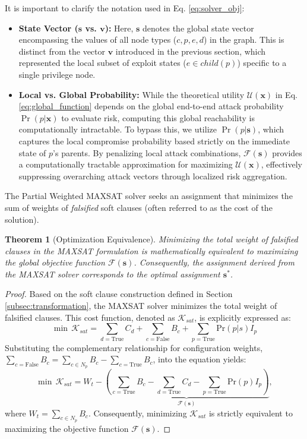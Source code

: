 \documentclass[conference]{IEEEtran}
\theoremstyle{definition} %
\theoremstyle{plain} %
\newtheorem{theorem}{Theorem}
\begin{document}
It is important to clarify the notation used in Eq. \eqref{eq:solver_obj}:
\begin{itemize}
    \item \textbf{State Vector ($\mathbf{s}$ vs. $\mathbf{v}$):} Here, $\mathbf{s}$ denotes the global state vector encompassing the values of all node types ($c, p, e, d$) in the graph. This is distinct from the vector $\mathbf{v}$ introduced in the previous section, which represented the local subset of exploit states ($e \in child(p)$) specific to a single privilege node.
    
    \item \textbf{Local vs. Global Probability:} While the theoretical utility $\mathcal{U}(\mathbf{x})$ in Eq. \eqref{eq:global_function} depends on the global end-to-end attack probability $\Pr(p|\mathbf{x})$ to evaluate risk, computing this global reachability is computationally intractable. To bypass this, we utilize $\Pr(p|\mathbf{s})$, which captures the local compromise probability based strictly on the immediate state of $p$'s parents. By penalizing local attack combinations, $\mathcal{F}(\mathbf{s})$ provides a computationally tractable approximation for maximizing $\mathcal{U}(\mathbf{x})$, effectively suppressing overarching attack vectors through localized risk aggregation.
\end{itemize}

The Partial Weighted MAXSAT solver seeks an assignment that minimizes the sum of weights of \textit{falsified} soft clauses (often referred to as the cost of the solution).

\begin{theorem}[Optimization Equivalence]
\label{thm:optim}
Minimizing the total weight of falsified clauses in the MAXSAT formulation is mathematically equivalent to maximizing the global objective function $\mathcal{F}(\mathbf{s})$. Consequently, the assignment derived from the MAXSAT solver corresponds to the optimal assignment $\mathbf{s}^*$.
\end{theorem}

\begin{proof}
Based on the soft clause construction defined in Section \ref{subsec:transformation}, the MAXSAT solver minimizes the total weight of falsified clauses. This cost function, denoted as $\mathcal{K}_{sat}$, is explicitly expressed as:
\begin{equation}
    \min\, \mathcal{K}_{sat} = \sum_{d=\text{True}} C_d + \sum_{c=\text{False}} B_c + \sum_{p=\text{True}} \text{Pr}(p|s)I_p
\end{equation}
Substituting the complementary relationship for configuration weights, $\sum_{c=\text{False}} B_c = \sum_{c \in N_p} B_c - \sum_{c=\text{True}} B_c$, into the equation yields:
\begin{equation}
    \min\, \mathcal{K}_{sat} = W_{t} - \underbrace{\left( \sum_{c=\text{True}} B_c - \sum_{d=\text{True}} C_d - \sum_{p=\text{True}} \text{Pr}(p)I_p \right)}_{\mathcal{F}(\mathbf{s})},
\end{equation}
where $W_{t} = \sum_{c \in N_p}B_c$. 
Consequently, minimizing $\mathcal{K}_{sat}$ is strictly equivalent to maximizing the objective function $\mathcal{F}(\mathbf{s})$.
\end{proof}
\end{document}

